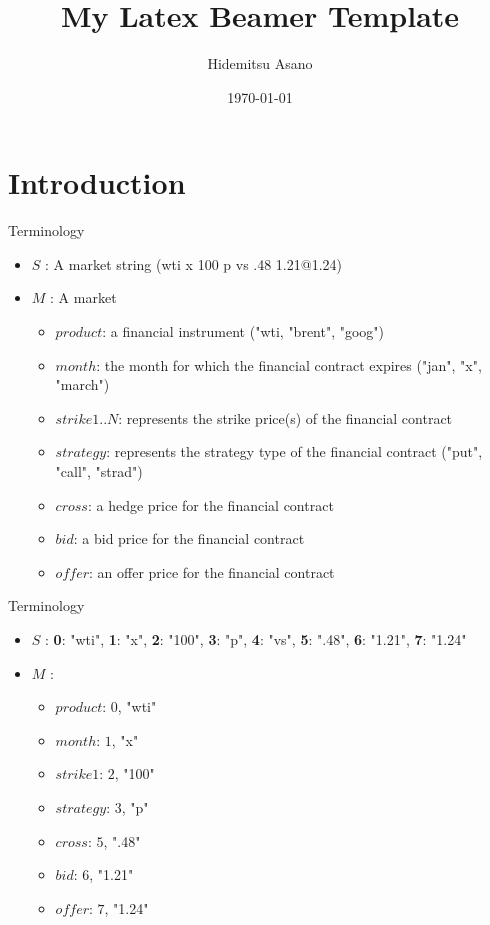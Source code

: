 \documentclass{beamer}
\title[latex beamter template]{My Latex Beamer Template}
\author{Hidemitsu Asano}
\institute[Kyoto Univ./RIKEN]{Kyoto Univ./RIKEN}
\date{\today}
\begin{document}
{
\begin{frame}
  \titlepage
\end{frame}
}





\section{Introduction}
\begin{frame}{Terminology}
 \begin{itemize}
  \item $S$ : A market string (wti x 100 p vs .48 1.21@1.24)
  \pause
  \item $M$ : A market 
  \begin{itemize}
  	\item $product$: a financial instrument ("wti, "brent", "goog")
    \item $month$: the month for which the financial contract expires ("jan", "x", "march")
    \item $strike1..N$: represents the strike price(s) of the financial contract
    \item $strategy$: represents the strategy type of the financial contract ("put", "call", "strad")
    \item $cross$: a hedge price for the financial contract
    \item $bid$: a bid price for the financial contract
    \item $offer$: an offer price for the financial contract
  \end{itemize}
 \end{itemize}
\end{frame}


\begin{frame}{Terminology}
 \begin{itemize}
  \item $S$ : \newline\textbf{0}: "wti", \textbf{1}: "x", \textbf{2}: "100", \textbf{3}: "p", \textbf{4}: "vs", \textbf{5}: ".48", \textbf{6}: "1.21", \textbf{7}: "1.24"
  \item $M$ : 
  \begin{itemize}
  	\item $product$: $0$, "wti"
    \item $month$: $1$, "x"
    \item $strike1$: $2$, "100"
    \item $strategy$: $3$, "p"
    \item $cross$: $5$, ".48"
    \item $bid$: $6$, "1.21"
    \item $offer$: $7$, "1.24"
  \end{itemize}
 \end{itemize}
\end{frame}
\end{document}
